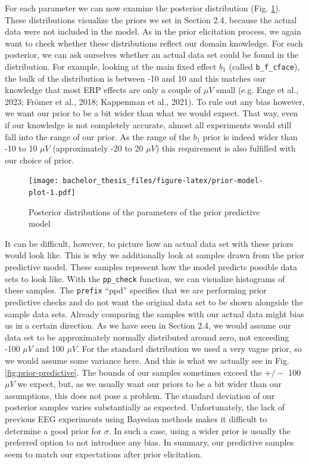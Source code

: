 \documentclass[
  doc,12pt,floatsintext]{apa7}
\begin{document}
For each parameter we can now examine the posterior distribution (Fig. \ref{fig:prior-model-plot}). These distributions visualize the priors we set in Section 2.4, because the actual data were not included in the model. As in the prior elicitation process, we again want to check whether these distributions reflect our domain knowledge. For each posterior, we can ask ourselves whether an actual data set could be found in the distribution. For example, looking at the main fixed effect \(b_1\) (called \texttt{b\_f\_cface}), the bulk of the distribution is between -10 and 10 and this matches our knowledge that most ERP effects are only a couple of \(\mu V\) small (e.g. Enge et al., 2023; Frömer et al., 2018; Kappenman et al., 2021). To rule out any bias however, we want our prior to be a bit wider than what we would expect. That way, even if our knowledge is not completely accurate, almost all experiments would still fall into the range of our prior. As the range of the \(b_1\) prior is indeed wider than -10 to 10 \(\mu V\) (approximately -20 to 20 \(\mu V\)) this requirement is also fulfilled with our choice of prior.



\begin{figure}
\centering
\texttt{[image: bachelor\_thesis\_files/figure-latex/prior-model-plot-1.pdf]}
\caption{\label{fig:prior-model-plot}Posterior distributions of the parameters of the prior predictive model}
\end{figure}

It can be difficult, however, to picture how an actual data set with these priors would look like. This is why we additionally look at samples drawn from the prior predictive model. These samples represent how the model predicts possible data sets to look like. With the \texttt{pp\_check} function, we can visualize histograms of these samples. The \texttt{prefix} ``ppd'' specifies that we are performing prior predictive checks and do not want the original data set to be shown alongside the sample data sets. Already comparing the samples with our actual data might bias us in a certain direction. As we have seen in Section 2.4, we would assume our data set to be approximately normally distributed around zero, not exceeding -100 \(\mu V\) and 100 \(\mu V\). For the standard distribution we used a very vague prior, so we would assume some variance here. And this is what we actually see in Fig. \ref{fig:prior-predictive}. The bounds of our samples sometimes exceed the \(+/-\) 100 \(\mu V\) we expect, but, as we usually want our priors to be a bit wider than our assumptions, this does not pose a problem. The standard deviation of our posterior samples varies substantially as expected. Unfortunately, the lack of previous EEG experiments using Bayesian methods makes it difficult to determine a good prior for \(\sigma\). In such a case, using a wider prior is usually the preferred option to not introduce any bias. In summary, our predictive samples seem to match our expectations after prior elicitation.
\end{document}
